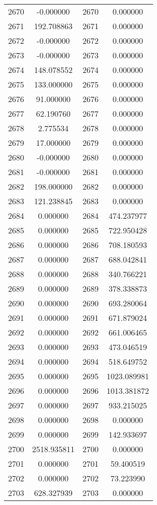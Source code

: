 \documentclass[12pt]{article}
\begin{document}
\begin{longtable}{@{}cccc@{}}
2670 & -0.000000 & 2670 & 0.000000 \\
2671 & 192.708863 & 2671 & 0.000000 \\
2672 & -0.000000 & 2672 & 0.000000 \\
2673 & -0.000000 & 2673 & 0.000000 \\
2674 & 148.078552 & 2674 & 0.000000 \\
2675 & 133.000000 & 2675 & 0.000000 \\
2676 & 91.000000 & 2676 & 0.000000 \\
2677 & 62.190760 & 2677 & 0.000000 \\
2678 & 2.775534 & 2678 & 0.000000 \\
2679 & 17.000000 & 2679 & 0.000000 \\
2680 & -0.000000 & 2680 & 0.000000 \\
2681 & -0.000000 & 2681 & 0.000000 \\
2682 & 198.000000 & 2682 & 0.000000 \\
2683 & 121.238845 & 2683 & 0.000000 \\
2684 & 0.000000 & 2684 & 474.237977 \\
2685 & 0.000000 & 2685 & 722.950428 \\
2686 & 0.000000 & 2686 & 708.180593 \\
2687 & 0.000000 & 2687 & 688.042841 \\
2688 & 0.000000 & 2688 & 340.766221 \\
2689 & 0.000000 & 2689 & 378.338873 \\
2690 & 0.000000 & 2690 & 693.280064 \\
2691 & 0.000000 & 2691 & 671.879024 \\
2692 & 0.000000 & 2692 & 661.006465 \\
2693 & 0.000000 & 2693 & 473.046519 \\
2694 & 0.000000 & 2694 & 518.649752 \\
2695 & 0.000000 & 2695 & 1023.089981 \\
2696 & 0.000000 & 2696 & 1013.381872 \\
2697 & 0.000000 & 2697 & 933.215025 \\
2698 & 0.000000 & 2698 & 0.000000 \\
2699 & 0.000000 & 2699 & 142.933697 \\
2700 & 2518.935811 & 2700 & 0.000000 \\
2701 & 0.000000 & 2701 & 59.400519 \\
2702 & 0.000000 & 2702 & 73.223990 \\
2703 & 628.327939 & 2703 & 0.000000 \\

\end{longtable}
\end{document}
